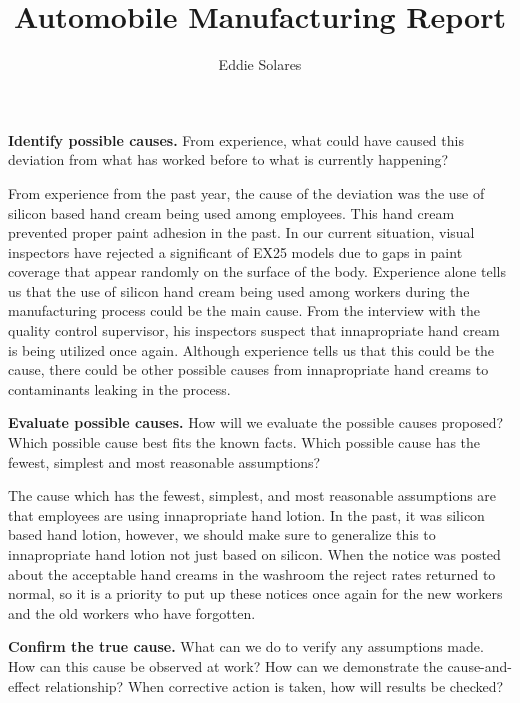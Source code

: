 \documentclass[12pt]{article}
\title{Automobile Manufacturing Report}
\author{Eddie Solares}
\date{}
\begin{document}
\maketitle

\begin{framed} 
\textbf{Identify possible causes.} From experience, what could have caused this deviation from what has worked before to what is currently happening? 
\end{framed}

From experience from the past year, the cause of the deviation was the use of silicon based hand cream being used among employees. This hand cream prevented proper paint adhesion in the past. In our current situation, visual inspectors have rejected a significant of EX25 models due to gaps in paint coverage that appear randomly on the surface of the body. Experience alone tells us that the use of silicon hand cream being used among workers during the manufacturing process could be the main cause. From the interview with the quality control supervisor, his inspectors suspect that innapropriate hand cream is being utilized once again. Although experience tells us that this could be the cause, there could be other possible causes from innapropriate hand creams to contaminants leaking in the process. 

\begin{framed}
\textbf{Evaluate possible causes.} How will we evaluate the possible causes proposed? Which possible cause best fits the known facts. Which possible cause has the fewest,
simplest and most reasonable assumptions?
\end{framed}

The cause which has the fewest, simplest, and most reasonable assumptions are that employees are using innapropriate hand lotion. In the past, it was silicon based hand lotion, however, we should make sure to generalize this to innapropriate hand lotion not just based on silicon. When the notice was posted about the acceptable hand creams in the washroom the reject rates returned to normal, so it is a priority to put up these notices once again for the new workers and the old workers who have forgotten.

\begin{framed}
\textbf{Confirm the true cause.} What can we do to verify any assumptions made. How can this cause be observed at work? How can we demonstrate the cause-and-effect relationship? When corrective action is taken, how will results be checked?
\end{framed}
\end{document}
